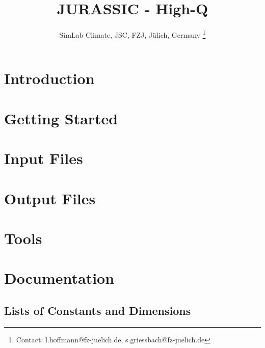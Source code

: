 \documentclass[12pt,a4paper,titlepage,openright,twoside]{book}
\begin{document}

\frontmatter
\author{SimLab Climate, JSC, FZJ, J\"u{}lich, Germany \footnote{Contact: l.hoffmann@fz-juelich.de, s.griessbach@fz-juelich.de}}
\title{JURASSIC - High-Q}
\maketitle

\tableofcontents

\mainmatter

\chapter{Introduction}


\chapter{Getting Started}


\chapter{Input Files}
\label{chap:input}


\chapter{Output Files}
\label{chap:output}


\chapter{Tools}
\label{chap:tools}


\chapter{Documentation}
\label{chap:docu}


\begin{appendix}
\chapter{Lists of Constants and Dimensions}

\end{appendix}



\backmatter


%

%
\end{document}
